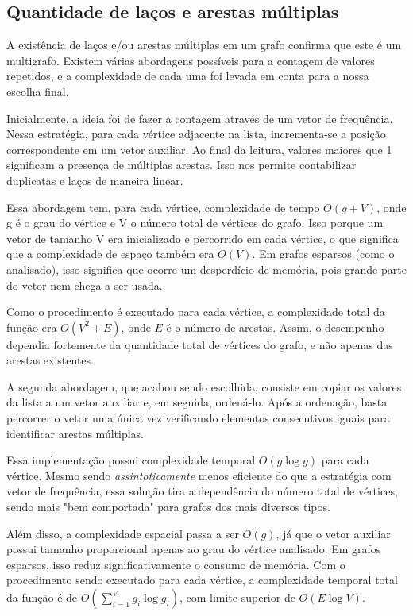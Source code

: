 \documentclass[a4paper, 12pt]{article}
\begin{document}
\subsection{Quantidade de laços e arestas múltiplas}

A existência de laços e/ou arestas múltiplas em um grafo confirma que este é um
multigrafo. Existem várias abordagens possíveis para a contagem de valores repetidos,
e a complexidade de cada uma foi levada em conta para a nossa escolha final.

Inicialmente, a ideia foi de fazer a contagem através de um vetor de frequência.
Nessa estratégia, para cada vértice adjacente na lista, incrementa-se a posição
correspondente em um vetor auxiliar. Ao final da leitura, valores maiores que 1
significam a presença de múltiplas arestas. Isso nos permite contabilizar duplicatas
e laços de maneira linear.

Essa abordagem tem, para cada vértice, complexidade de tempo $O(g + V)$,
onde g é o grau do vértice e V o número total de vértices do grafo. Isso porque
um vetor de tamanho V era inicializado e percorrido em cada vértice, o que significa
que a complexidade de espaço também era $O(V)$.
Em grafos esparsos (como o analisado), isso significa que ocorre um desperdício
de memória, pois grande parte do vetor nem chega a ser usada.

Como o procedimento é executado para cada vértice, a complexidade total da função
era \(O(V^2 + E)\), onde \(E\) é o número de arestas.
Assim, o desempenho dependia fortemente da quantidade total de vértices do grafo,
e não apenas das arestas existentes.

A segunda abordagem, que acabou sendo escolhida, consiste em copiar os valores da
lista a um vetor auxiliar e, em seguida, ordená-lo. Após a ordenação, basta percorrer
o vetor uma única vez verificando elementos consecutivos iguais para identificar
arestas múltiplas.

Essa implementação possui complexidade temporal $O(g \log g)$ para cada vértice.
Mesmo sendo \textit{assintoticamente} menos eficiente do que a estratégia com vetor
de frequência, essa solução tira a dependência do número total de vértices, sendo
mais "bem comportada" para grafos dos mais diversos tipos.

Além disso, a complexidade espacial passa a ser $O(g)$, já que o vetor
auxiliar possui tamanho proporcional apenas ao grau do vértice analisado. Em grafos
esparsos, isso reduz significativamente o consumo de memória.
Com o procedimento sendo executado para cada vértice, a complexidade temporal
total da função é de $O(\sum_{i=1}^V g_i \log g_i)$, com limite superior de $O(E\log V)$.
\end{document}
